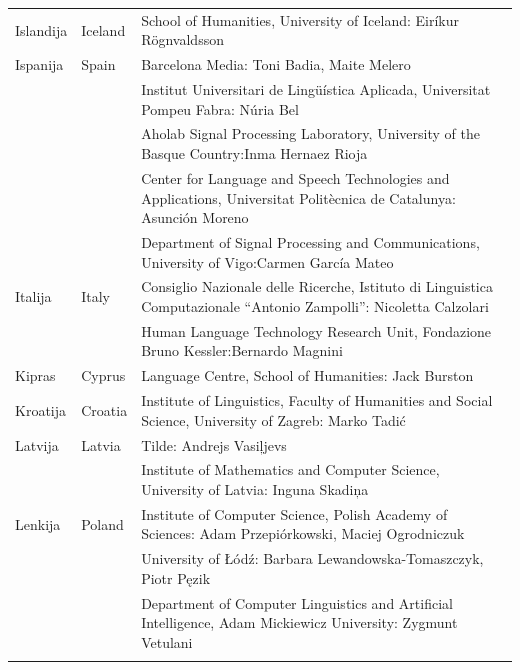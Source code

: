 \begin{longtable}{llp{113mm}}
  Islandija & \textcolor{grey1}{Iceland} & School of Humanities, University of Iceland: Eiríkur Rögnvaldsson\\ \addlinespace
  
  Ispanija & \textcolor{grey1}{Spain} & Barcelona Media: Toni Badia, Maite Melero \\ \addlinespace 
  & & Institut Universitari de Lingüística Aplicada, Universitat Pompeu Fabra: Núria Bel \\ \addlinespace 
  & & Aholab Signal Processing Laboratory, University of the Basque Country:\newline Inma Hernaez Rioja \\ \addlinespace 
  & & Center for Language and Speech Technologies and Applications, Universitat Politècnica de Catalunya:  Asunción Moreno \\ \addlinespace 
  & & Department of Signal Processing and Communications, University of Vigo:\newline Carmen García Mateo \\ \addlinespace 
  
  Italija & \textcolor{grey1}{Italy} & Consiglio Nazionale delle Ricerche, Istituto di Linguistica Computazionale “Antonio Zampolli”: Nicoletta Calzolari\\ \addlinespace
  & & Human Language Technology Research Unit, Fondazione Bruno Kessler:\newline Bernardo Magnini\\ \addlinespace
  
  Kipras & \textcolor{grey1}{Cyprus} &  Language Centre, School of Humanities: Jack Burston\\ \addlinespace
  
  Kroatija & \textcolor{grey1}{Croatia} & Institute of Linguistics, Faculty of Humanities and Social Science, University of Zagreb: Marko Tadić \\ \addlinespace
  
  Latvija & \textcolor{grey1}{Latvia} & Tilde: Andrejs Vasiļjevs\\ \addlinespace 
  & & Institute of Mathematics and Computer Science, University of Latvia: Inguna Skadiņa\\ \addlinespace
               
  Lenkija & \textcolor{grey1}{Poland} & Institute of Computer Science, Polish Academy of Sciences: Adam Przepiórkowski, Maciej Ogrodniczuk \\ \addlinespace
  & & University of Łódź: Barbara Lewandowska-Tomaszczyk, Piotr Pęzik\\ \addlinespace
  & & Department of Computer Linguistics and Artificial Intelligence, Adam Mickiewicz University: Zygmunt Vetulani \\ \addlinespace
  

\end{longtable}
